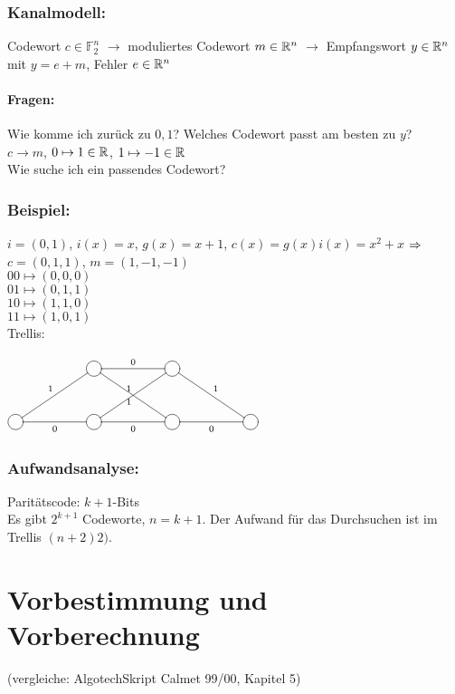 \documentclass[a4paper]{scrartcl}
\begin{document}
\subsubsection{Kanalmodell: }
Codewort $c\in \mathbb{F}_2^n$ $\rightarrow$ moduliertes Codewort $m\in \mathbb{R}^n$ $\rightarrow$ Empfangswort $y\in \mathbb{R}^n$ mit $y = e + m$, Fehler $e \in \mathbb{R}^n$\\
\paragraph{Fragen:} Wie komme ich zurück zu $0,1$? Welches Codewort passt am besten zu $y$?\\
$c\rightarrow m$, $0 \mapsto 1 \in \mathbb{R}$, $1 \mapsto -1 \in \mathbb{R}$\\
Wie suche ich ein passendes Codewort?
\subsubsection{Beispiel:} 
$i=(0,1)$, $i(x)=x$, $g(x)=x+1$, $c(x)=g(x) i(x) = x^2 + x$ $\Rightarrow$ $c=(0,1,1)$, $m=(1,-1,-1)$\\
$00 \mapsto (0,0,0)$\\
$01 \mapsto (0,1,1)$\\
$10 \mapsto (1,1,0)$\\
$11 \mapsto (1,0,1)$\\
Trellis:
\begin{center}
$\begin{xy}
		\entrymodifiers={++[o][F-]}
		\xymatrix @R=30pt @C=50pt {
	  	*{} & {}\ar@{-}[r]^0\ar@{-}[rd]_1& {}\ar@{-}[rd]^1 & *{} \\ 
	  	{}\ar@{-}[ru]^1\ar@{-}[r]_0 & {}\ar@{-}[ru]^1\ar@{-}[r]_0& {}\ar@{-}[r]_0 & {}	  	
		}
\end{xy}$
\end{center}
\subsubsection{Aufwandsanalyse:}
Paritätscode: $k+1$-Bits\\
Es gibt $2^{k+1}$ Codeworte, $n=k+1$. Der Aufwand für das Durchsuchen ist im Trellis $(n+2)2)$.


\section{Vorbestimmung und Vorberechnung}
(vergleiche: AlgotechSkript Calmet 99/00, Kapitel 5)
\end{document}
